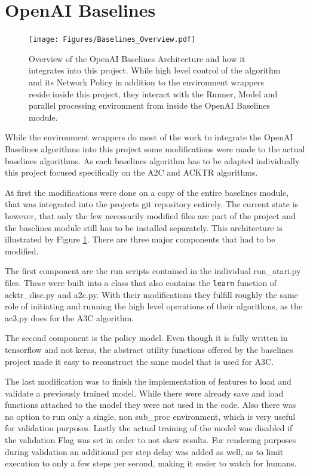 \section{OpenAI Baselines}
\label{sec:baselinesproj}
\begin{figure}[htb]
  \centering
      \texttt{[image: Figures/Baselines\_Overview.pdf]}
  \caption{ Overview of the OpenAI Baselines Architecture and how it integrates into this project. While high level control of the algorithm and its Network Policy in addition to the environment wrappers reside inside this project, they interact with the Runner, Model and parallel processing environment from inside the OpenAI Baselines module.}
  \label{fig:openoverview}
\end{figure}

While the environment wrappers do most of the work to integrate the OpenAI Baselines algorithms into this project some modifications were made to the actual baselines algorithms. As each baselines algorithm has to be adapted individually this project focused specifically on the A2C and ACKTR algorithms.

At first the modifications were done on a copy of the entire baselines module, that was integrated into the projects git repository entirely. The current state is however, that only the few necessarily modified files are part of the project and the baselines module still has to be installed separately. This architecture is illustrated by Figure \ref{fig:openoverview}. There are three major components that had to be modified.

The first component are the run scripts contained in the individual run\_atari.py files. These were built into a class that also contains the \lstinline{learn} function of acktr\_disc.py and a2c.py. With their modifications they fulfill roughly the same role of initiating and running the high level operations of their algorithms, as the ac3.py does for the A3C algorithm.

The second component is the policy model. Even though it is fully written in tensorflow and not keras, the abstract utility functions offered by the baselines project made it easy to reconstruct the same model that is used for A3C.

The last modification was to finish the implementation of features to load and validate a previously trained model. While there were already save and load functions attached to the model they were not used in the code. Also there was no option to run only a single, non sub\_proc environment, which is very useful for validation purposes. 
Lastly the actual training of the model was disabled if the validation Flag was set in order to not skew results.
For rendering purposes during validation an additional per step delay was added as well, as to limit execution to only a few steps per second, making it easier to watch for humans.

